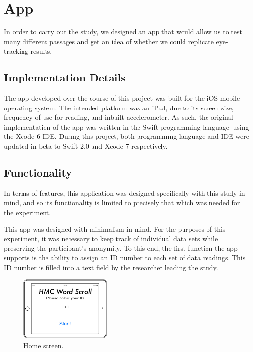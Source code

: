 \documentclass[11pt,letterpaper]{article}
\begin{document}
	\section{App}
	
	In order to carry out the study, we designed an app that would allow us to test many different passages and get an idea of whether we could replicate eye-tracking results.
	
	\subsection{Implementation Details}
	
	The app developed over the course of this project was built for the iOS mobile operating system. The intended platform was an iPad, due to its screen size, frequency of use for reading, and inbuilt accelerometer. As such, the original implementation of the app was written in the Swift programming language, using the Xcode 6 IDE. During this project, both programming language and IDE were updated in beta to Swift 2.0 and Xcode 7 respectively.
	
	\subsection{Functionality}
	
	In terms of features, this application was designed specifically with this study in mind, and so its functionality is limited to precisely that which was needed for the experiment.
	
	This app was designed with minimalism in mind. For the purposes of this experiment, it was necessary to keep track of individual data sets while preserving the participant's anonymity. To this end, the first function the app supports is the ability to assign an ID number to each set of data readings. This ID number is filled into a text field by the researcher leading the study.
	
	\begin{figure}[H]
		\centering
		\includegraphics[width=0.4\textwidth]{splashscreen.png}
		\caption{Home screen.}
	\end{figure}
	
\end{document}
